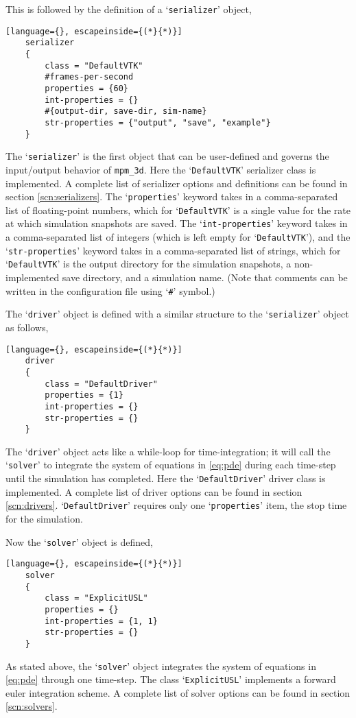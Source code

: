 This is followed by the definition of a `\texttt{serializer}' object,
\begin{lstlisting}[language={}, escapeinside={(*}{*)}]
    serializer
    {
        class = "DefaultVTK"
        #frames-per-second
        properties = {60}
        int-properties = {}
        #{output-dir, save-dir, sim-name}
        str-properties = {"output", "save", "example"}
    }	
\end{lstlisting}
The `\texttt{serializer}' is the first object that can be user-defined and governs the input/output behavior of \texttt{mpm\_3d}. Here the `\texttt{DefaultVTK}' serializer class is implemented. A complete list of serializer options and definitions can be found in section \ref{scn:serializers}. The `\texttt{properties}' keyword takes in a comma-separated list of floating-point numbers, which for `\texttt{DefaultVTK}' is a single value for the rate at which simulation snapshots are saved. The `\texttt{int-properties}' keyword takes in a comma-separated list of integers (which is left empty for `\texttt{DefaultVTK}'), and the `\texttt{str-properties}' keyword takes in a comma-separated list of strings, which for `\texttt{DefaultVTK}' is the output directory for the simulation snapshots, a non-implemented save directory, and a simulation name. (Note that comments can be written in the configuration file using `\texttt{\#}' symbol.)

The `\texttt{driver}' object is defined with a similar structure to the `\texttt{serializer}' object as follows,
\begin{lstlisting}[language={}, escapeinside={(*}{*)}]
    driver
    {
        class = "DefaultDriver"
        properties = {1}
        int-properties = {}
        str-properties = {}
    }
\end{lstlisting}
The `\texttt{driver}' object acts like a while-loop for time-integration; it will call the `\texttt{solver}' to integrate the system of equations in \eqref{eq:pde} during each time-step until the simulation has completed. Here the `\texttt{DefaultDriver}' driver class is implemented. A complete list of driver options can be found in section \ref{scn:drivers}. `\texttt{DefaultDriver}' requires only one `\texttt{properties}' item, the stop time for the simulation.

Now the `\texttt{solver}' object is defined,
\begin{lstlisting}[language={}, escapeinside={(*}{*)}]
    solver
    {
        class = "ExplicitUSL"
        properties = {}
        int-properties = {1, 1}
        str-properties = {}
    }
\end{lstlisting}
As stated above, the `\texttt{solver}' object integrates the system of equations in \eqref{eq:pde} through one time-step. The class `\texttt{ExplicitUSL}' implements a forward euler integration scheme. A complete list of solver options can be found in section \ref{scn:solvers}.

